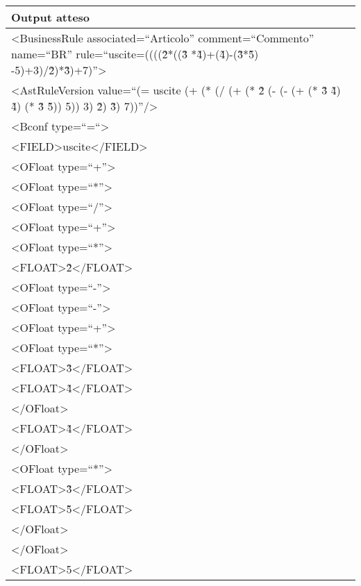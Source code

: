 \begin{center}
\begin{tabular}{|p{11cm}|} \hline
\textbf{Output atteso}\\ \hline
\textless BusinessRule associated=``Articolo'' comment=``Commento'' name=``BR'' rule=``uscite=((((\~2*((\~3 *\~4)+(\~4)-(\~3*\~5) -5)+3)/\~2)*\~3)+7)''\textgreater \\
\textless AstRuleVersion value=``(= uscite (+ (* (/ (+ (* \~2 (- (- (+ (* \~3 \~4) \~4) (* \~3 \~5)) 5)) 3) \~2) \~3) 7))''/\textgreater\\ 
\textless Bconf type=``=``\textgreater \\
\textless FIELD\textgreater uscite\textless /FIELD\textgreater \\
\textless OFloat type=``+''\textgreater \\
\textless OFloat type=``*''\textgreater \\
\textless OFloat type=``/''\textgreater \\
\textless OFloat type=``+''\textgreater \\
\textless OFloat type=``*''\textgreater \\
\textless FLOAT\textgreater \~2\textless /FLOAT\textgreater \\
\textless OFloat type=``-''\textgreater \\
\textless OFloat type=``-''\textgreater \\
\textless OFloat type=``+''\textgreater \\
\textless OFloat type=``*''\textgreater \\
\textless FLOAT\textgreater \~3\textless /FLOAT\textgreater \\
\textless FLOAT\textgreater \~4\textless /FLOAT\textgreater \\
\textless /OFloat\textgreater \\
\textless FLOAT\textgreater \~4\textless /FLOAT\textgreater \\
\textless /OFloat\textgreater \\
\textless OFloat type=``*''\textgreater \\
\textless FLOAT\textgreater \~3\textless /FLOAT\textgreater \\
\textless FLOAT\textgreater \~5\textless /FLOAT\textgreater \\
\textless /OFloat\textgreater \\
\textless /OFloat\textgreater \\
\textless FLOAT\textgreater 5\textless /FLOAT\textgreater \\

\end{tabular}
\end{center}
